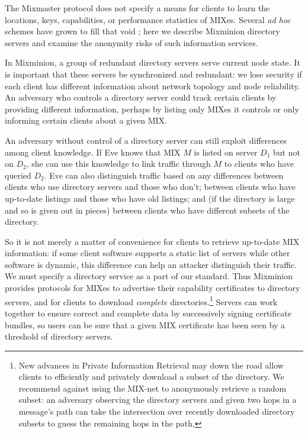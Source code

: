 \documentclass{llncs}
\begin{document}
The Mixmaster protocol does not specify a means for clients to learn the
locations, keys, capabilities, or performance statistics of MIXes. Several
\emph{ad hoc} schemes have grown to fill that void \cite{levien}; here
we describe Mixminion directory servers and examine the anonymity risks
of such information services.


In Mixminion, a group of redundant directory servers serve current
node state.  It is important that these servers be synchronized and
redundant:  we lose security if each client has different information
about network topology and node reliability. An adversary who controls
a directory server could track certain clients by providing different
information, perhaps by listing only MIXes it controls or only
informing certain clients about a given MIX.

An adversary without control of a directory server can still exploit
differences among client knowledge. If Eve knows that MIX $M$ is listed
on server $D_1$ but not on $D_2$, she can use this knowledge to link
traffic through $M$ to clients who have queried $D_2$.  Eve can also
distinguish traffic based on any differences between clients who use
directory servers and those who don't; between clients who have up-to-date
listings and those who have old listings; and (if the directory is large
and so is given out in pieces) between clients who have different subsets
of the directory.

So it is not merely a matter of convenience for clients to retrieve
up-to-date MIX information: if some client software supports a static
list of servers while other software is dynamic, this difference can
help an attacker distinguish their traffic. We must specify a directory
service as a part of our standard. Thus Mixminion provides protocols for
MIXes to advertise their capability certificates to directory servers,
and for clients to download \emph{complete} directories.\footnote{
  New advances in Private Information Retrieval \cite{malkin-thesis}
  may down 
  the
  road allow clients to efficiently and privately download a subset of
  the directory. We recommend against using the MIX-net to anonymously
  retrieve a random subset: an adversary observing the directory servers
  and given two hops in a message's path can take the intersection over
  recently downloaded directory subsets to guess the remaining hops in
  the path.}
Servers can work together to ensure correct and complete data by
successively signing certificate bundles, so users can be sure that a
given MIX certificate has been seen by a threshold of directory servers.
\end{document}
